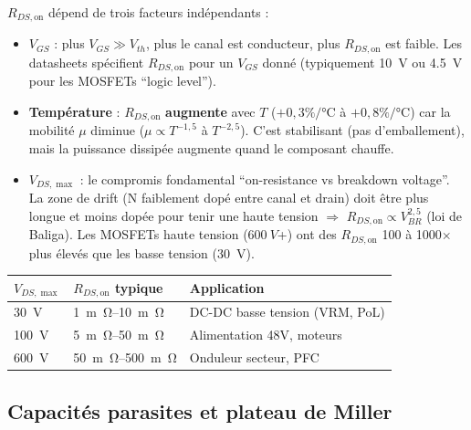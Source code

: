\documentclass[12pt,a4paper,twoside]{book}
\begin{document}
\begin{formule}
$R_{DS,\text{on}}$ dépend de trois facteurs indépendants :
\begin{itemize}[nosep]
\item \textbf{$V_{GS}$} : plus $V_{GS} \gg V_{th}$, plus le canal est conducteur, plus $R_{DS,\text{on}}$ est faible. Les datasheets spécifient $R_{DS,\text{on}}$ pour un $V_{GS}$ donné (typiquement \SI{10}{V} ou \SI{4.5}{V} pour les MOSFETs ``logic level'').
\item \textbf{Température} : $R_{DS,\text{on}}$ \textbf{augmente} avec $T$ ($+0{,}3\%/°$C à $+0{,}8\%/°$C) car la mobilité $\mu$ diminue ($\mu \propto T^{-1{,}5}$ à $T^{-2{,}5}$). C'est stabilisant (pas d'emballement), mais la puissance dissipée augmente quand le composant chauffe.
\item \textbf{$V_{DS,\max}$} : le compromis fondamental ``on-resistance vs breakdown voltage''. La zone de drift (N faiblement dopé entre canal et drain) doit être plus longue et moins dopée pour tenir une haute tension $\Rightarrow$ $R_{DS,\text{on}} \propto V_{BR}^{2{,}5}$ (loi de Baliga). Les MOSFETs haute tension ($\SI{600}{V}$+) ont des $R_{DS,\text{on}}$ 100 à 1000$\times$ plus élevés que les basse tension (\SI{30}{V}).
\end{itemize}
\end{formule}

\begin{pratique}
\begin{center}
\begin{tabular}{lll}
\toprule
\textbf{$V_{DS,\max}$} & \textbf{$R_{DS,\text{on}}$ typique} & \textbf{Application} \\
\midrule
\SI{30}{V} & \SI{1}{m\ohm}--\SI{10}{m\ohm} & DC-DC basse tension (VRM, PoL) \\
\SI{100}{V} & \SI{5}{m\ohm}--\SI{50}{m\ohm} & Alimentation 48V, moteurs \\
\SI{600}{V} & \SI{50}{m\ohm}--\SI{500}{m\ohm} & Onduleur secteur, PFC \\
\bottomrule
\end{tabular}
\end{center}
\end{pratique}

\subsection{Capacités parasites et plateau de Miller}
\end{document}
